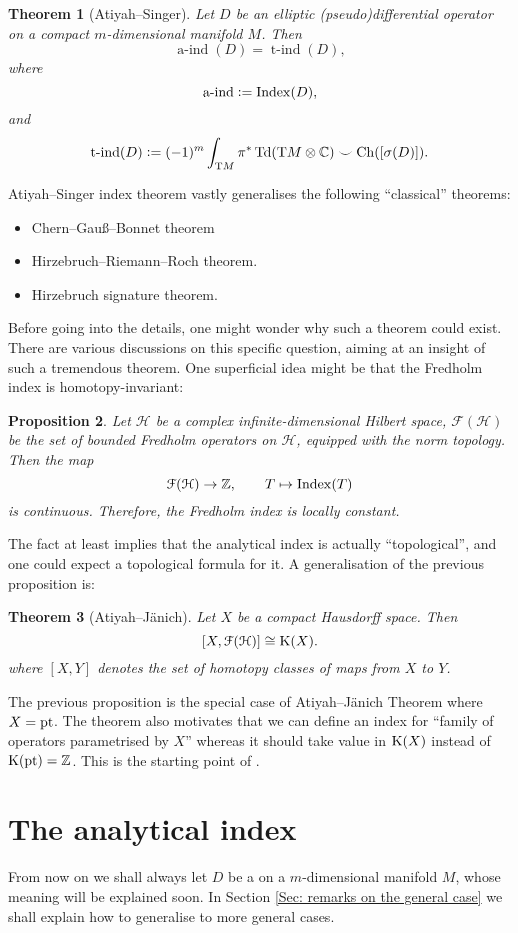 \documentclass[reqno]{scrartcl}
\newtheorem{theorem}{Theorem}[section]
\newtheorem{proposition}[theorem]{Proposition}
\theoremstyle{definition}
\theoremstyle{remark}
\newcommand{\aind}{\operatorname{a-ind}}
\newcommand{\tind}{\operatorname{t-ind}}
\newcommand{\Hilb}{\mathcal{H}}
\newcommand{\Fred}{\mathcal{F}}
\renewcommand{\cup}{\smile}
\begin{document}
\begin{theorem}[Atiyah--Singer]
Let $D$ be an elliptic (pseudo)differential operator on a compact $m$-dimensional manifold $M$. Then
\[ \aind(D)=\tind(D), \]
where
\[ \aind\defeq\Index(D), \]
and
\[ \tind(D)\defeq(-1)^m\int_{\mathrm{T}M}\pi^*\Td(\mathrm{T}M\otimes\C)\cup\Ch([\sigma(D)]). \]
\end{theorem}

Atiyah--Singer index theorem vastly generalises the following ``classical'' theorems:
\begin{itemize}
\item Chern--Gauß--Bonnet theorem
\item Hirzebruch--Riemann--Roch theorem.
\item Hirzebruch signature theorem.
\end{itemize}

Before going into the details, one might wonder why such a theorem could exist. There are various discussions on this specific question, aiming at an insight of such a tremendous theorem. One superficial idea might be that the Fredholm index is homotopy-invariant:

\begin{proposition}
Let $\Hilb$ be a complex infinite-dimensional Hilbert space, $\Fred(\Hilb)$ be the set of bounded Fredholm operators on $\Hilb$, equipped with the norm topology. Then the map 
\[ \Fred(\Hilb)\to\Z,\qquad T\mapsto\Index(T) \] 
is continuous. Therefore, the Fredholm index is locally constant.
\end{proposition}

The fact at least implies that the analytical index is actually ``topological'', and one could expect a topological formula for it. A generalisation of the previous proposition is:

\begin{theorem}[Atiyah--Jänich]
Let $X$ be a compact Hausdorff space. Then
\[ [X,\Fred(\Hilb)]\cong\K(X). \]
where $[X,Y]$ denotes the set of homotopy classes of maps from $X$ to $Y$.
\end{theorem}

The previous proposition is the special case of Atiyah--Jänich Theorem where $X=\operatorname{pt}$. The theorem also motivates that we can define an index for ``family of operators parametrised by $X$'' whereas it should take value in $\operatorname{K}(X)$ instead of $\operatorname{K}(\operatorname{pt})=\mathbb{Z}$. This is the starting point of \cite{atiyahsinger4}.



\section{The analytical index}
From now on we shall always let $D$ be a  on a  $m$-dimensional manifold $M$, whose meaning will be explained soon. In Section \ref{Sec: remarks on the general case} we shall explain how to generalise to more general cases.
\end{document}
